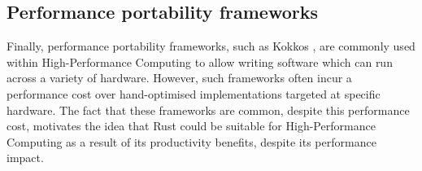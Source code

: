 

%     

%     




\subsection{Performance portability frameworks}
\label{ssec:performance-portability-frameworks}

Finally, performance portability frameworks, such as Kokkos \cite{KokkosEcosystem}, are commonly used within High-Performance Computing to allow writing software which can run across a variety of hardware. However, such frameworks often incur a performance cost over hand-optimised implementations targeted at specific hardware. The fact that these frameworks are common, despite this performance cost, motivates the idea that Rust could be suitable for High-Performance Computing as a result of its productivity benefits, despite its performance impact.

